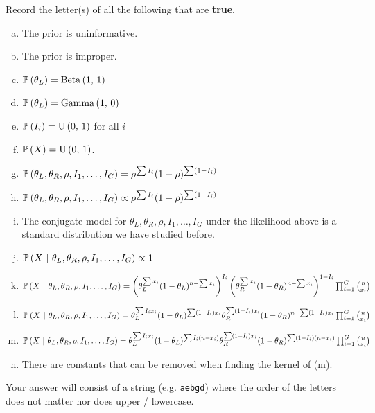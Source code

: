 \documentclass[12pt]{article}
\newcommand{\instr}{\scriptsize Your answer will consist of a string (e.g. \texttt{aebgd}) where the order of the letters does not matter nor does upper / lowercase. \normalsize}
\newcommand{\recordletters}{\small Record the letter(s) of all the following that are \textbf{true}. \normalsize}
\begin{document}
\benum{} \recordletters

\begin{enumerate}[(a)]
\item The prior is uninformative.
\item The prior is improper.
\item $\mathbb{P}\left(\theta_L\right) = \mathrm{Beta}\left(1,\,1\right)$
\item $\mathbb{P}\left(\theta_L\right) = \mathrm{Gamma}\left(1,\,0\right)$
\item $\mathbb{P}\left(I_i\right) = \mathrm{U}\left(0,\,1\right)$ for all $i$
\item $\mathbb{P}\left(X\right) = \mathrm{U}\left(0,\,1\right)$.
\item $\mathbb{P}\left(\theta_L, \theta_R, \rho, I_1, \ldots, I_G\right) =  \rho^{\sum I_i} (1 - \rho)^{\sum (1 - I_i)}$
\item $\mathbb{P}\left(\theta_L, \theta_R, \rho, I_1, \ldots, I_G\right) \propto \rho^{\sum I_i} (1 - \rho)^{\sum (1 - I_i)}$
\item The conjugate model for $\theta_L, \theta_R, \rho, I_1, \ldots, I_G$ under the likelihood above is a standard distribution we have studied before.
\item $\mathbb{P}\left(X~|~\theta_L, \theta_R, \rho, I_1, \ldots, I_G\right) \propto 1$
\item $\mathbb{P}\left(X~|~\theta_L, \theta_R, \rho, I_1, \ldots, I_G\right) = \left(\theta_L^{\sum x_i} (1 - \theta_L)^{n - \sum x_i}\right)^{I_i} \left(\theta_R^{\sum x_i} (1 - \theta_R)^{n - \sum x_i}\right)^{1 - I_i} \prod_{i=1}^G \binom{n}{x_i} $
\item $\mathbb{P}\left(X~|~\theta_L, \theta_R, \rho, I_1, \ldots, I_G\right) = \theta_L^{\sum I_i x_i} (1 - \theta_L)^{\sum  (1 - I_i) x_i}\theta_R^{\sum (1 - I_i) x_i} (1 - \theta_R)^{n - \sum (1 - I_i) x_i} \prod_{i=1}^G \binom{n}{x_i} $
\item $\mathbb{P}\left(X~|~\theta_L, \theta_R, \rho, I_1, \ldots, I_G\right) = \theta_L^{\sum I_i x_i} (1 - \theta_L)^{\sum I_i(n - x_i)}\theta_R^{\sum (1 - I_i) x_i} (1 - \theta_R)^{\sum (1 - I_i) (n - x_i)} \prod_{i=1}^G \binom{n}{x_i} $
\item There are constants that can be removed when finding the kernel of (m).
\end{enumerate}\eenum\instr\pagebreak

\problem [15min] 
\end{document}

